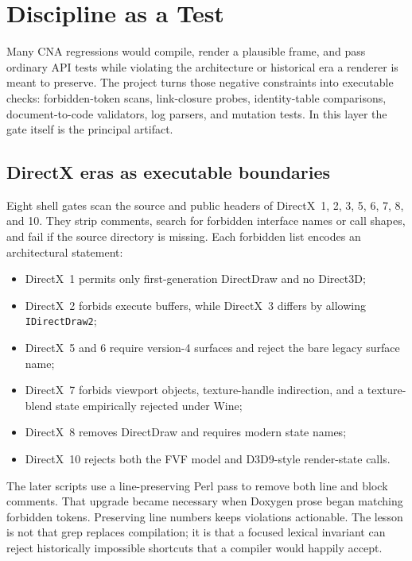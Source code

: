 \chapter{Discipline as a Test}
\label{ch:discipline-as-test}

Many CNA regressions would compile, render a plausible frame, and pass ordinary API tests while
violating the architecture or historical era a renderer is meant to preserve.  The project turns
those negative constraints into executable checks: forbidden-token scans, link-closure probes,
identity-table comparisons, document-to-code validators, log parsers, and mutation tests.  In
this layer the gate itself is the principal artifact.

\section{DirectX eras as executable boundaries}

Eight shell gates scan the source and public headers of DirectX~1, 2, 3, 5, 6, 7, 8, and 10.
They strip comments, search for forbidden interface names or call shapes, and fail if the source
directory is missing.  Each forbidden list encodes an architectural statement:

\begin{itemize}
  \item DirectX~1 permits only first-generation DirectDraw and no Direct3D;
  \item DirectX~2 forbids execute buffers, while DirectX~3 differs by allowing
        \texttt{IDirectDraw2};
  \item DirectX~5 and 6 require version-4 surfaces and reject the bare legacy surface name;
  \item DirectX~7 forbids viewport objects, texture-handle indirection, and a texture-blend
        state empirically rejected under Wine;
  \item DirectX~8 removes DirectDraw and requires modern state names;
  \item DirectX~10 rejects both the FVF model and D3D9-style render-state calls.
\end{itemize}

The later scripts use a line-preserving Perl pass to remove both line and block comments.  That
upgrade became necessary when Doxygen prose began matching forbidden tokens.  Preserving line
numbers keeps violations actionable.  The lesson is not that grep replaces compilation; it is
that a focused lexical invariant can reject historically impossible shortcuts that a compiler
would happily accept.

